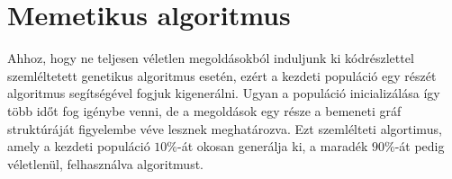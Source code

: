 \section{Memetikus algoritmus}\label{sec:MEMETIKUS_ALGORITMUS}

Ahhoz, hogy ne teljesen véletlen megoldásokból induljunk ki 
kódrészlettel szemléltetett genetikus algoritmus esetén,
ezért a kezdeti populáció egy részét  algoritmus segítségével fogjuk kigenerálni.
Ugyan a populáció inicializálása így több időt fog igénybe venni,
de a megoldások egy része a bemeneti gráf struktúráját figyelembe véve lesznek meghatározva.
Ezt szemlélteti  algortimus, amely a kezdeti populáció $10\%$-át okosan generálja ki,
a maradék $90\%$-át pedig véletlenül, felhasználva  algoritmust.

